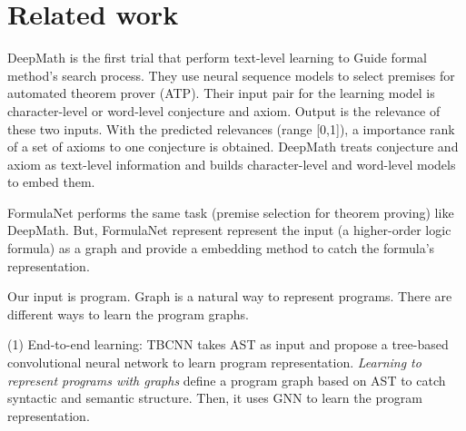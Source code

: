 \documentclass{article}
\begin{document}
\section{Related work}

DeepMath \cite{NIPS2016_6280} is the first trial that perform text-level learning to Guide formal method's search process. They use neural sequence models to select premises for automated theorem prover (ATP). Their input pair for the learning model is character-level or word-level conjecture and axiom. Output is the relevance of these two inputs. With the predicted relevances (range [0,1]), a importance rank of a set of axioms to one conjecture is obtained. DeepMath treats conjecture and axiom as text-level information and builds character-level and word-level models to embed them.

FormulaNet \cite{NIPS2017_6871} performs the same task (premise selection for theorem proving) like DeepMath. But, FormulaNet represent represent the input (a higher-order logic formula) as a graph and provide a embedding method to catch the formula's representation.

Our input is program.  Graph is a natural way to represent programs. There are different ways to learn the program graphs. 

(1) End-to-end learning: TBCNN \cite{DBLP:journals/corr/MouLJZW14} takes AST as input and propose a tree-based convolutional neural network to learn program representation. \textit{Learning to represent programs with graphs} \cite{DBLP:journals/corr/abs-1711-00740} define a program graph based on AST to catch syntactic and semantic structure. Then, it uses GNN to learn the program representation.  
\end{document}
